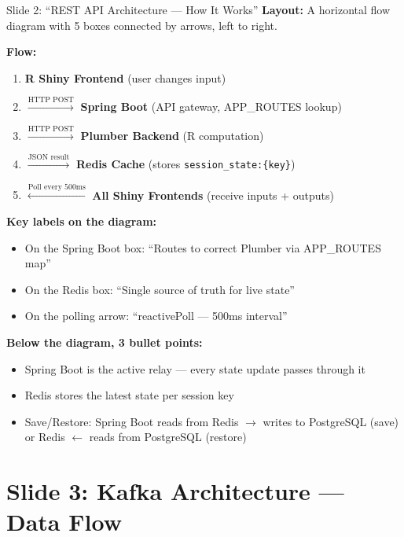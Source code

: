 \documentclass[12pt,a4paper]{article}
\begin{document}
\begin{slidebox}{Slide 2: ``REST API Architecture --- How It Works''}
\textbf{Layout:} A horizontal flow diagram with 5 boxes connected by arrows, left to right.

\textbf{Flow:}
\begin{enumerate}[nosep]
  \item \textbf{R Shiny Frontend} (user changes input)
  \item $\xrightarrow{\text{HTTP POST}}$ \textbf{Spring Boot} (API gateway, APP\_ROUTES lookup)
  \item $\xrightarrow{\text{HTTP POST}}$ \textbf{Plumber Backend} (R computation)
  \item $\xrightarrow{\text{JSON result}}$ \textbf{Redis Cache} (stores \texttt{session\_state:\{key\}})
  \item $\xleftarrow{\text{Poll every 500ms}}$ \textbf{All Shiny Frontends} (receive inputs + outputs)
\end{enumerate}

\textbf{Key labels on the diagram:}
\begin{itemize}[nosep]
  \item On the Spring Boot box: ``Routes to correct Plumber via APP\_ROUTES map''
  \item On the Redis box: ``Single source of truth for live state''
  \item On the polling arrow: ``reactivePoll --- 500ms interval''
\end{itemize}

\textbf{Below the diagram, 3 bullet points:}
\begin{itemize}[nosep]
  \item Spring Boot is the active relay --- every state update passes through it
  \item Redis stores the latest state per session key
  \item Save/Restore: Spring Boot reads from Redis $\rightarrow$ writes to PostgreSQL (save) or Redis $\leftarrow$ reads from PostgreSQL (restore)
\end{itemize}
\end{slidebox}

\section{Slide 3: Kafka Architecture --- Data Flow}
\end{document}

